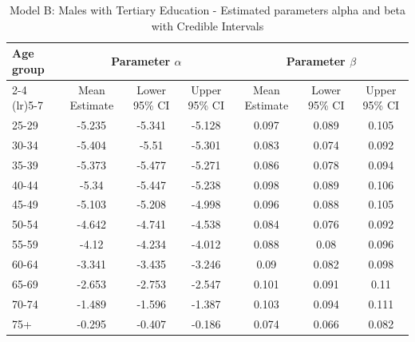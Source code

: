 \begin{landscape}
\begin{table}[htbp]
\centering
\caption{Model B: Males with Tertiary Education - Estimated parameters alpha and beta  with Credible Intervals}
\label{tab:parameters_ab16}
\begin{tabular}{@{}lcccccc@{}}
\toprule
Age group & \multicolumn{3}{c}{Parameter \(\alpha\)} & \multicolumn{3}{c}{Parameter \(\beta\)} \\ 
\cmidrule(lr){2-4} \cmidrule(lr){5-7}
          & Mean Estimate & Lower 95\% CI & Upper 95\% CI & Mean Estimate & Lower 95\% CI & Upper 95\% CI \\ 
\midrule
25-29 & -5.235 & -5.341 & -5.128 & 0.097 & 0.089 & 0.105 \\
30-34 & -5.404 & -5.51 & -5.301 & 0.083 & 0.074 & 0.092 \\
35-39 & -5.373 & -5.477 & -5.271 & 0.086 & 0.078 & 0.094 \\
40-44 & -5.34 & -5.447 & -5.238 & 0.098 & 0.089 & 0.106 \\
45-49 & -5.103 & -5.208 & -4.998 & 0.096 & 0.088 & 0.105 \\
50-54 & -4.642 & -4.741 & -4.538 & 0.084 & 0.076 & 0.092 \\
55-59 & -4.12 & -4.234 & -4.012 & 0.088 & 0.08 & 0.096 \\
60-64 & -3.341 & -3.435 & -3.246 & 0.09 & 0.082 & 0.098 \\
65-69 & -2.653 & -2.753 & -2.547 & 0.101 & 0.091 & 0.11 \\
70-74 & -1.489 & -1.596 & -1.387 & 0.103 & 0.094 & 0.111 \\
75+ & -0.295 & -0.407 & -0.186 & 0.074 & 0.066 & 0.082 \\
\bottomrule
\end{tabular}
\end{table}
\end{landscape}